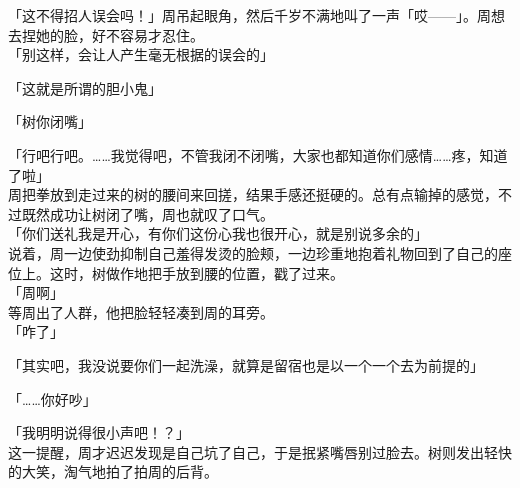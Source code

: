 「这不得招人误会吗！」周吊起眼角，然后千岁不满地叫了一声「哎——」。周想去捏她的脸，好不容易才忍住。\\

「别这样，会让人产生毫无根据的误会的」

「这就是所谓的胆小鬼」

「树你闭嘴」

「行吧行吧。……我觉得吧，不管我闭不闭嘴，大家也都知道你们感情……疼，知道了啦」\\

周把拳放到走过来的树的腰间来回搓，结果手感还挺硬的。总有点输掉的感觉，不过既然成功让树闭了嘴，周也就叹了口气。\\

「你们送礼我是开心，有你们这份心我也很开心，就是别说多余的」\\

说着，周一边使劲抑制自己羞得发烫的脸颊，一边珍重地抱着礼物回到了自己的座位上。这时，树做作地把手放到腰的位置，戳了过来。\\

「周啊」\\

等周出了人群，他把脸轻轻凑到周的耳旁。\\

「咋了」

「其实吧，我没说要你们一起洗澡，就算是留宿也是以一个一个去为前提的」

「……你好吵」

「我明明说得很小声吧！？」\\

这一提醒，周才迟迟发现是自己坑了自己，于是抿紧嘴唇别过脸去。树则发出轻快的大笑，淘气地拍了拍周的后背。
